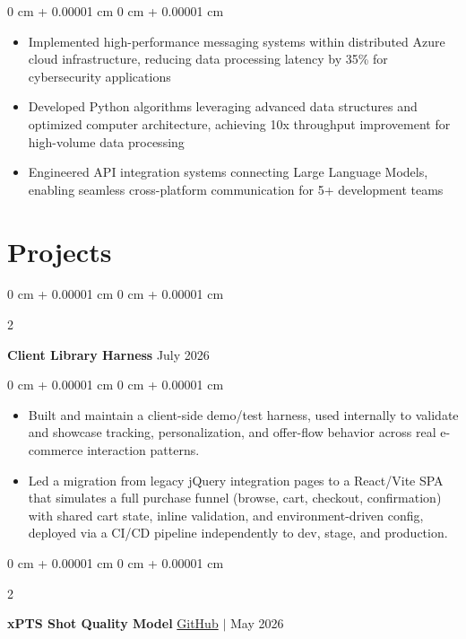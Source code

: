 \documentclass[10pt, letterpaper]{article}
\newenvironment{highlights}{
    \begin{itemize}[
        topsep=0.06 cm,
        parsep=0.06 cm,
        partopsep=0pt,
        itemsep=0pt,
        leftmargin=0 cm + 10pt
    ]
}{
    \end{itemize}
}
\newenvironment{onecolentry}{
    \begin{adjustwidth}{
        0 cm + 0.00001 cm
    }{
        0 cm + 0.00001 cm
    }
}{
    \end{adjustwidth}
}
\newenvironment{twocolentry}[2][]{
    \onecolentry
    \def\secondColumn{#2}
    \setcolumnwidth{\fill, 4.5 cm}
    \begin{paracol}{2}
}{
    \switchcolumn \raggedleft \secondColumn
    \end{paracol}
    \endonecolentry
}
\begin{document}
\vspace{0.06 cm}
\begin{onecolentry}
    \begin{highlights}
        \item Implemented high-performance messaging systems within distributed Azure cloud infrastructure, reducing data processing latency by 35\% for cybersecurity applications
        \item Developed Python algorithms leveraging advanced data structures and optimized computer architecture, achieving 10x throughput improvement for high-volume data processing
        \item Engineered API integration systems connecting Large Language Models, enabling seamless cross-platform communication for 5+ development teams
    \end{highlights}
\end{onecolentry}

\section{Projects}

\begin{twocolentry}{
     July 2026
}
    \textbf{Client Library Harness}\end{twocolentry}

\vspace{0.06 cm}
\begin{onecolentry}
    \begin{highlights}
        \item Built and maintain a client-side demo/test harness, used internally to validate and showcase tracking, personalization, and offer-flow behavior across real e-commerce interaction patterns.
        \item Led a migration from legacy jQuery integration pages to a React/Vite SPA that simulates a full purchase funnel (browse, cart, checkout, confirmation) with shared cart state, inline validation, and environment-driven config, deployed via a CI/CD pipeline independently to dev, stage, and production.
    \end{highlights}
\end{onecolentry}

\begin{twocolentry}{
    \href{https://github.com/Amin9666/xPTS-Shot-Quality-Model}{GitHub} $|$ May 2026
}
    \textbf{xPTS Shot Quality Model}\end{twocolentry}
\end{document}

